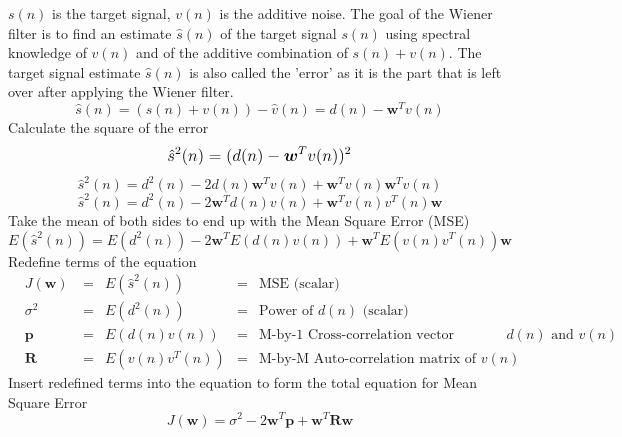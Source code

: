 $s(n)$ is the target signal, $v(n)$ is the additive noise. The goal of the Wiener filter is to find an estimate $\hat{s}(n)$ of the target signal $s(n)$ using spectral knowledge of $v(n)$ and of the additive combination of $s(n)+v(n)$. The target signal estimate $\hat{s}(n)$ is also called the 'error' as it is the part that is left over after applying the Wiener filter.
  \begin{equation}\label{eq:start_wiener}
    \hat{s}(n) = (s(n) + v(n)) - \hat{v}(n) = d(n) - \boldsymbol{w}^T v(n)
  \end{equation}
Calculate the square of the error \cite{lecture_adaptive_filters_1}
\begin{equation}
    \hat{s}^2(n) = \large(d(n) - \boldsymbol{w}^T v(n)\large)^2
\end{equation}
\begin{equation}
    \hat{s}^2(n) = d^2(n) - 2d(n)\boldsymbol{w}^T v(n) + \boldsymbol{w}^T v(n)\boldsymbol{w}^T v(n)
\end{equation}
\begin{equation}
    \hat{s}^2(n) = d^2(n) - 2 \boldsymbol{w}^T d(n) v(n) + \boldsymbol{w}^T v(n) v^T(n) \boldsymbol{w}
\end{equation}
Take the mean of both sides to end up with the Mean Square Error (MSE) \cite{lecture_adaptive_filters_1}
\begin{equation}
    E\left(\hat{s}^2(n)\right) = E\left(d^2(n)\right) - 2 \boldsymbol{w}^T E\left(d(n) v(n)\right) + \boldsymbol{w}^T E\left(v(n) v^T(n)\right) \boldsymbol{w}
\end{equation}
Redefine terms of the equation \cite{lecture_adaptive_filters_1}
\begin{align}
&J(\boldsymbol{w}) \                  &=& E(\hat{s}^2(n))  &=& \text{MSE (scalar)} \label{eq:wiener_mse_def}\\
&\sigma^2 \           &=& E(d^2(n))        &=& \text{Power of }d(n) \text{ (scalar)} \\
&\boldsymbol{p} \      &=& E(d(n) v(n))     &=& \text{M-by-1 Cross-correlation vector between } d(n) \text{ and } v(n)  \\
&\boldsymbol{R} \      &=& E(v(n) v^T(n))  &=& \text{M-by-M Auto-correlation matrix of } v(n)
\end{align}
Insert redefined terms into the equation to form the total equation for Mean Square Error \cite{lecture_adaptive_filters_1}
\begin{equation}
    J(\boldsymbol{w}) = \sigma^2 - 2 \boldsymbol{w}^T \boldsymbol{p} + \boldsymbol{w}^T \boldsymbol{R} \boldsymbol{w}
\end{equation}
